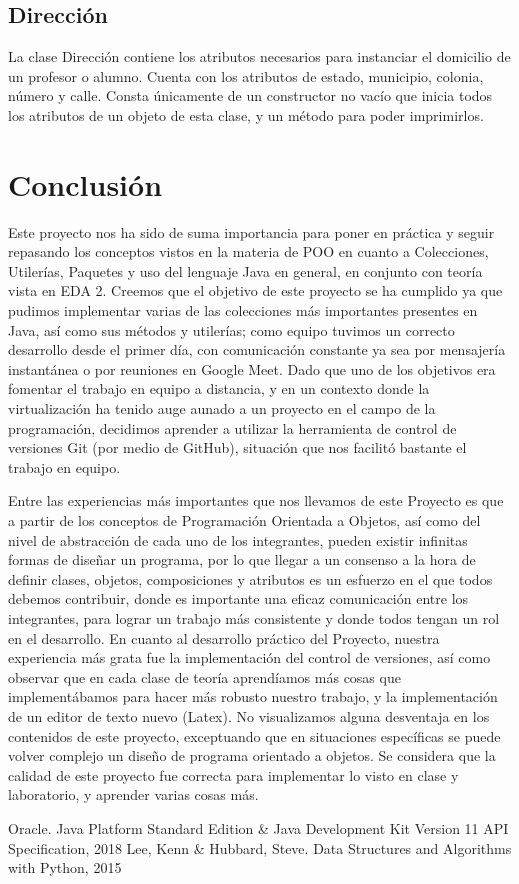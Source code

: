 \documentclass[11pt]{article}
\begin{document}
\subsection{Dirección}
\par

La clase Dirección contiene los atributos necesarios para instanciar el domicilio de un profesor o alumno. Cuenta con los atributos de estado, municipio, colonia, número y calle. Consta únicamente de un constructor no vacío que inicia todos los atributos de un objeto de esta clase, y un método para poder imprimirlos.

\section{Conclusión}
\par

Este proyecto nos ha sido de suma importancia para poner en práctica y seguir repasando los conceptos vistos en la materia de POO en cuanto a Colecciones, Utilerías, Paquetes y uso del lenguaje Java en general, en conjunto con teoría vista en EDA 2. Creemos que el objetivo de este proyecto se ha cumplido ya que pudimos implementar varias de las colecciones más importantes presentes en Java, así como sus métodos y utilerías; como equipo tuvimos un correcto desarrollo desde el primer día, con comunicación constante ya sea por mensajería instantánea o por reuniones en Google Meet. Dado que uno de los objetivos era fomentar el trabajo en equipo a distancia, y en un contexto donde la virtualización ha tenido auge aunado a un proyecto en el campo de la programación, decidimos aprender a utilizar la herramienta de control de versiones Git (por medio de GitHub), situación que nos facilitó bastante el trabajo en equipo.
\par
Entre las experiencias más importantes que nos llevamos de este Proyecto es que a partir de los conceptos de Programación Orientada a Objetos, así como del nivel de abstracción de cada uno de los integrantes, pueden existir infinitas formas de diseñar un programa, por lo que llegar a un consenso a la hora de definir clases, objetos, composiciones y atributos es un esfuerzo en el que todos debemos contribuir, donde es importante una eficaz comunicación entre los integrantes, para lograr un trabajo más consistente y donde todos tengan un rol en el desarrollo. En cuanto al desarrollo práctico del Proyecto, nuestra experiencia más grata fue la implementación del control de versiones, así como observar que en cada clase de teoría aprendíamos más cosas que implementábamos para hacer más robusto nuestro trabajo, y la implementación de un editor de texto nuevo (Latex). No visualizamos alguna desventaja en los contenidos de este proyecto, exceptuando que en situaciones específicas se puede volver complejo un diseño de programa orientado a objetos. Se considera que la calidad de este proyecto fue correcta para implementar lo visto en clase y laboratorio, y aprender varias cosas más.

\begin{thebibliography}{0}
 Oracle. Java Platform Standard Edition \& Java Development Kit
Version 11 API Specification, 2018
 Lee, Kenn \& Hubbard, Steve. Data Structures and Algorithms with Python, 2015
\end{thebibliography}
\end{document}
